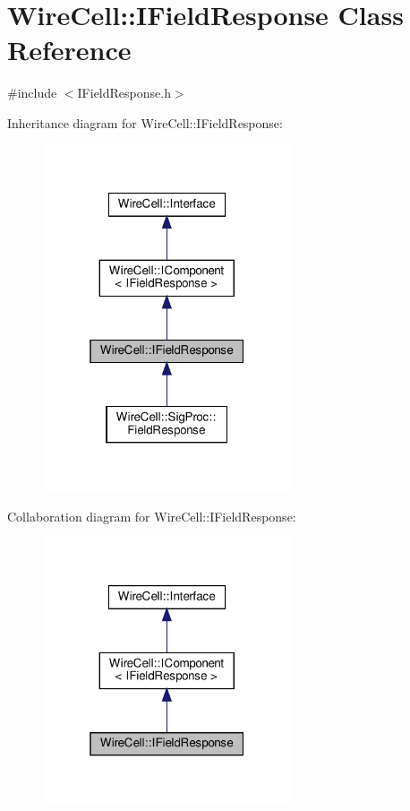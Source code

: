 \hypertarget{class_wire_cell_1_1_i_field_response}{}\section{Wire\+Cell\+:\+:I\+Field\+Response Class Reference}
\label{class_wire_cell_1_1_i_field_response}


{\ttfamily \#include $<$I\+Field\+Response.\+h$>$}



Inheritance diagram for Wire\+Cell\+:\+:I\+Field\+Response\+:
\nopagebreak
\begin{figure}[H]
\begin{center}
\leavevmode
\includegraphics[width=208pt]{class_wire_cell_1_1_i_field_response__inherit__graph}
\end{center}
\end{figure}


Collaboration diagram for Wire\+Cell\+:\+:I\+Field\+Response\+:
\nopagebreak
\begin{figure}[H]
\begin{center}
\leavevmode
\includegraphics[width=208pt]{class_wire_cell_1_1_i_field_response__coll__graph}
\end{center}
\end{figure}
